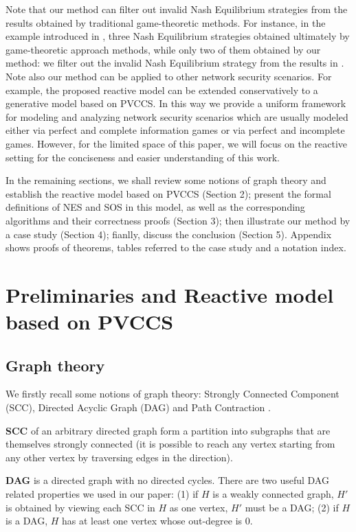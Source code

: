 \documentclass{acm_proc_article-sp}
\begin{document}
Note that our method can filter out invalid Nash Equilibrium strategies from the results obtained by traditional game-theoretic methods. For instance, in the example introduced in \cite{klye},
three Nash Equilibrium strategies obtained ultimately by game-theoretic approach methods,
while only two of them obtained by our method:
we filter out the invalid Nash Equilibrium strategy from the results in \cite{klye}.
Note also our method can be applied to other network security scenarios.
For example, the proposed reactive model can be extended conservatively to a generative model based on PVCCS.
In this way we provide a uniform framework for modeling and analyzing network security scenarios which are usually modeled either via perfect and complete information games or via perfect and incomplete games.
However, for the limited space of this paper, we will focus on the reactive setting for the conciseness and easier understanding of this work.

In the remaining sections, we shall
review some notions of graph theory and establish the reactive model based on PVCCS (Section 2);
present the formal definitions of NES and SOS in this model, as well as the corresponding algorithms
and their correctness proofs (Section 3);
then illustrate our method by a case study (Section 4);
fianlly, discuss the conclusion (Section 5).
Appendix shows proofs of theorems, tables referred to the case study and a notation index.

\section{Preliminaries and Reactive model based on PVCCS}

\subsection{Graph theory}
We firstly recall some notions of graph theory: Strongly Connected Component (SCC), Directed Acyclic Graph (DAG) and Path Contraction \cite{reinhard,serge,david}.

\textbf{SCC} of an arbitrary directed graph form a partition into subgraphs that are themselves strongly connected (it is possible to reach any vertex starting from any other vertex by traversing edges in the direction).

\textbf{DAG} is a directed graph with no directed cycles. There are two useful DAG related properties we used in our paper: (1) if $H$ is a weakly connected graph, $H'$ is obtained by viewing each SCC in $H$ as one vertex, $H'$ must be a DAG; (2) if $H$ is a DAG, $H$ has at least one vertex whose out-degree is 0.
\end{document}
